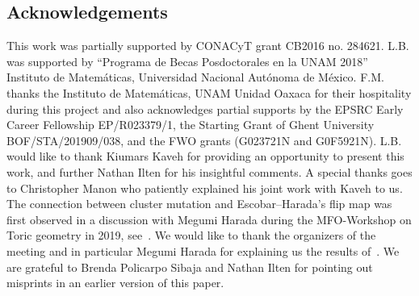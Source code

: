 \documentclass[10pt,a4paper]{amsart}
\numberwithin{equation}{section}
\begin{document}
\subsection*{Acknowledgements}
This work was partially supported by CONACyT grant CB2016 no. 284621.
L.B. was supported by ``Programa de Becas Posdoctorales en la UNAM 2018'' Instituto de Matem\'aticas, Universidad Nacional Aut\'onoma de M\'exico.
F.M. thanks the Instituto de Matem\'aticas, UNAM Unidad Oaxaca for their hospitality during this project and also acknowledges partial supports by the EPSRC Early Career Fellowship EP/R023379/1, the Starting Grant of Ghent University BOF/STA/201909/038, and the FWO grants (G023721N and G0F5921N).
L.B. would like to thank Kiumars Kaveh for providing an opportunity to present this work, and further Nathan Ilten for his insightful comments.
A special thanks goes to Christopher Manon who patiently explained his joint work with Kaveh to us. The connection between cluster mutation and Escobar--Harada's flip map was first observed in a discussion with Megumi Harada during the MFO-Workshop on Toric geometry in 2019, see~\cite{BHM}.
We would like to thank the organizers of the meeting and in particular Megumi Harada for explaining us the results of~\cite{EH-NObodies}.
We are grateful to Brenda Policarpo Sibaja and Nathan Ilten for pointing out misprints in an earlier version of this paper.

\end{document}
